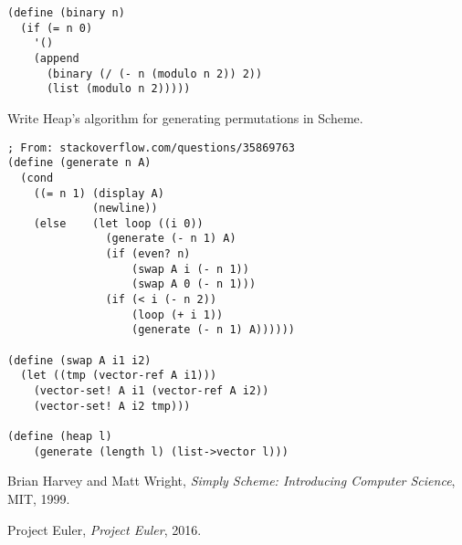 \begin{questions}
\begin{solution}
  \begin{verbatim}
(define (binary n)
  (if (= n 0)
    '()
    (append
      (binary (/ (- n (modulo n 2)) 2))
      (list (modulo n 2)))))
  \end{verbatim}
\end{solution}

\question
Write Heap's algorithm for generating permutations in Scheme.

\begin{solution}
  \begin{verbatim}
; From: stackoverflow.com/questions/35869763
(define (generate n A)
  (cond
    ((= n 1) (display A)
             (newline))
    (else    (let loop ((i 0))
               (generate (- n 1) A)
               (if (even? n)
                   (swap A i (- n 1))
                   (swap A 0 (- n 1)))
               (if (< i (- n 2))
                   (loop (+ i 1))
                   (generate (- n 1) A))))))

(define (swap A i1 i2)
  (let ((tmp (vector-ref A i1)))
    (vector-set! A i1 (vector-ref A i2))
    (vector-set! A i2 tmp)))

(define (heap l)
	(generate (length l) (list->vector l)))
  \end{verbatim}
\end{solution}

\end{questions}

\begin{thebibliography}{12}
  
  Brian Harvey and Matt Wright,
  \emph{Simply Scheme: Introducing Computer Science},
  MIT,
  1999.
  
  Project Euler,
  \emph{Project Euler},
  2016.

\end{thebibliography}

